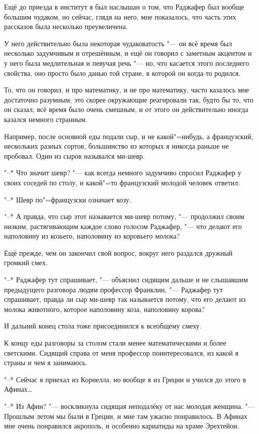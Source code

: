 Ещё до приезда в институт я был наслышан о том, что Раджафер был вообще большим
чудаком, но сейчас, глядя на него, мне показалось, что часть этих рассказов была
несколько преувеличена.

У него действительно была некоторая чудаковатость "--- он всё время был
несколько задумчивым и отрешённым, и ещё он говорил с заметным акцентом и у него
была медлительная и певучая речь "--- но, что касается этого последнего
свойства, оно просто было данью той стране, в которой он когда-то родился.

То, что он говорил, и про математику, и не про математику, часто казалось мне
достаточно разумным, это скорее окружающие реагировали так, будто бы то, что он
сказал, всё время было очень смешным, и от этого он действительно иногда казался
немного странным.

Например, после основной еды подали сыр, и не какой"=нибудь, а французский,
нескольких разных сортов, большинство из которых я никогда раньше не пробовал.
Один из сыров назывался ми-шевр.

"--* Что значит шевр? "--- как всегда немного задумчиво спросил Раджафер у своих
соседей по столу, и какой"=то французский молодой человек ответил:

"--* Шевр по"=французски означает козу.

"--* А правда, что сыр этот называется ми-шевр потому, "--- продолжил своим
низким, растягивающим каждое слово голосом Раджафер, "--- что делают его
наполовину из козьего, наполовину из коровьего молока?

Ещё прежде, чем он закончил свой вопрос, вокруг него раздался дружный громкий
смех.

"--* Раджафер тут спрашивает, "--- объяснил сидящим дальше и не слышавшим
предыдущего разговора людям профессор Франклин, "--- Раджафер тут спрашивает,
правда ли сыр ми-шевр так называется потому, что его делают из молока животного,
которое наполовину коза, наполовину корова?

И дальний конец стола тоже присоединился к всеобщему смеху.

К концу еды разговоры за столом стали менее математическими и более светскими.
Сидящий справа от меня профессор поинтересовался, из какой я страны и чем я
занимаюсь.

"--* Сейчас я приехал из Корнелла, но вообще я из Греции и учился до этого в
Афинах\ldots

"--* Из Афин? "--- воскликнула сидящая неподалёку от нас молодая женщина.
"--- Прошлым летом мы были в Греции, и мне там ужасно понравилось.
В Афинах мне очень понравился акрополь, и особенно кариатиды на храме Эрехтейон.

